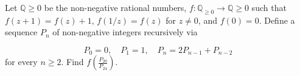 Let $\mathbb{Q} \geq 0$ be the non-negative rational numbers, $f: \mathbb{Q}_{\geq 0} \rightarrow \mathbb{Q} \geq 0$ such that $f(z+1)=f(z)+1$, $f(1 / z)=f(z)$ for $z \neq 0$, and $f(0)=0$. Define a sequence $P_{n}$ of non-negative integers recursively via

$$
P_{0}=0, \quad P_{1}=1, \quad P_{n}=2 P_{n-1}+P_{n-2}
$$
for every $n \geq 2$. Find $f\left(\frac{P_{20}}{P_{24}}\right)$.